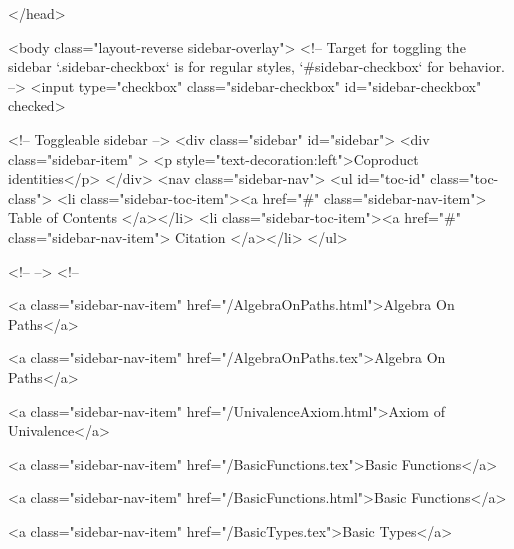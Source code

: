   
</head>




  <body class="layout-reverse sidebar-overlay">
    <!-- Target for toggling the sidebar `.sidebar-checkbox` is for regular
     styles, `#sidebar-checkbox` for behavior. -->
<input type="checkbox" class="sidebar-checkbox" id="sidebar-checkbox" checked>

<!-- Toggleable sidebar -->
<div class="sidebar" id="sidebar">
  <div class="sidebar-item" >
    <p style="text-decoration:left">Coproduct identities</p>
  </div>
  <nav class="sidebar-nav">
    <ul id="toc-id" class="toc-class">
  <li class="sidebar-toc-item"><a href="#" class="sidebar-nav-item"> Table of Contents </a></li>
  <li class="sidebar-toc-item"><a href="#" class="sidebar-nav-item"> Citation </a></li>
</ul>


    <!--  -->
    <!-- 
      
    
      
    
      
    
      
        
      
    
      
        
          <a class="sidebar-nav-item" href="/AlgebraOnPaths.html">Algebra On Paths</a>
        
      
    
      
        
          <a class="sidebar-nav-item" href="/AlgebraOnPaths.tex">Algebra On Paths</a>
        
      
    
      
        
          <a class="sidebar-nav-item" href="/UnivalenceAxiom.html">Axiom of Univalence</a>
        
      
    
      
        
          <a class="sidebar-nav-item" href="/BasicFunctions.tex">Basic Functions</a>
        
      
    
      
        
          <a class="sidebar-nav-item" href="/BasicFunctions.html">Basic Functions</a>
        
      
    
      
        
          <a class="sidebar-nav-item" href="/BasicTypes.tex">Basic Types</a>
        
      
    
      
        
